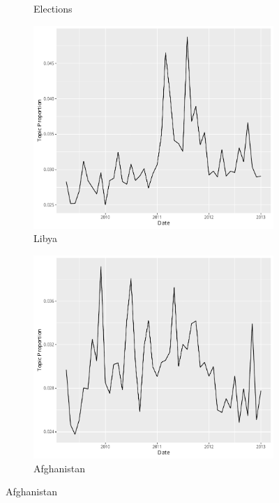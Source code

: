 \documentclass[12pt]{article}
\theoremstyle{definition}
\theoremstyle{algodesc}
\begin{document}
\begin{figure}[htb]
\begin{subfigure}[Elections]{.30\linewidth}
    \caption{Elections} \label{fig:t2}
\end{subfigure}
\begin{subfigure}[Libya]{.30\linewidth}
    \includegraphics[width=\linewidth]{../images/time_plot18.pdf}
    \caption{Libya} \label{fig:t3}
\end{subfigure}
\begin{subfigure}[Afghanistan]{.30\linewidth}
    \includegraphics[width=\linewidth]{../images/time_plot27.pdf}
    \caption{Afghanistan} \label{fig:t4}

\end{subfigure}
\end{figure}
\end{document}
